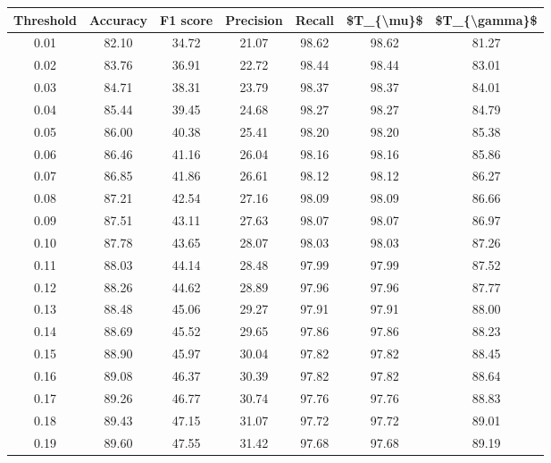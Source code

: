 \begin{tabular}{|c|c|c|c|c|c|c|}
\hline
 Threshold &  Accuracy &  F1 score &  Precision &  Recall &  \$T\_\{\textbackslash mu\}\$ &  \$T\_\{\textbackslash gamma\}\$ \\
\hline
      0.01 &     82.10 &     34.72 &      21.07 &   98.62 &      98.62 &         81.27 \\
      0.02 &     83.76 &     36.91 &      22.72 &   98.44 &      98.44 &         83.01 \\
      0.03 &     84.71 &     38.31 &      23.79 &   98.37 &      98.37 &         84.01 \\
      0.04 &     85.44 &     39.45 &      24.68 &   98.27 &      98.27 &         84.79 \\
      0.05 &     86.00 &     40.38 &      25.41 &   98.20 &      98.20 &         85.38 \\
      0.06 &     86.46 &     41.16 &      26.04 &   98.16 &      98.16 &         85.86 \\
      0.07 &     86.85 &     41.86 &      26.61 &   98.12 &      98.12 &         86.27 \\
      0.08 &     87.21 &     42.54 &      27.16 &   98.09 &      98.09 &         86.66 \\
      0.09 &     87.51 &     43.11 &      27.63 &   98.07 &      98.07 &         86.97 \\
      0.10 &     87.78 &     43.65 &      28.07 &   98.03 &      98.03 &         87.26 \\
      0.11 &     88.03 &     44.14 &      28.48 &   97.99 &      97.99 &         87.52 \\
      0.12 &     88.26 &     44.62 &      28.89 &   97.96 &      97.96 &         87.77 \\
      0.13 &     88.48 &     45.06 &      29.27 &   97.91 &      97.91 &         88.00 \\
      0.14 &     88.69 &     45.52 &      29.65 &   97.86 &      97.86 &         88.23 \\
      0.15 &     88.90 &     45.97 &      30.04 &   97.82 &      97.82 &         88.45 \\
      0.16 &     89.08 &     46.37 &      30.39 &   97.82 &      97.82 &         88.64 \\
      0.17 &     89.26 &     46.77 &      30.74 &   97.76 &      97.76 &         88.83 \\
      0.18 &     89.43 &     47.15 &      31.07 &   97.72 &      97.72 &         89.01 \\
      0.19 &     89.60 &     47.55 &      31.42 &   97.68 &      97.68 &         89.19 \\

\end{tabular}
